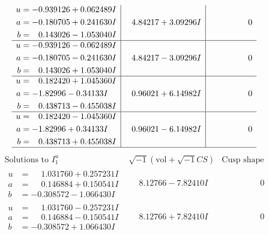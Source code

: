 \documentclass[1p]{elsarticle_modified}
\theoremstyle{definition}
\newcommand{\I}{\sqrt{-1}}
\begin{document}
$$\begin{array}{c|c|c}
\begin{aligned}
u &= -0.939126 + 0.062489 I \\
a &= -0.180705 + 0.241630 I \\
b &= \phantom{-}0.143026 - 1.053040 I\end{aligned}
 & \phantom{-}4.84217 + 3.09296 I & \phantom{-0.000000 } 0 \\ \hline\begin{aligned}
u &= -0.939126 - 0.062489 I \\
a &= -0.180705 - 0.241630 I \\
b &= \phantom{-}0.143026 + 1.053040 I\end{aligned}
 & \phantom{-}4.84217 - 3.09296 I & \phantom{-0.000000 } 0 \\ \hline\begin{aligned}
u &= \phantom{-}0.182420 + 1.045360 I \\
a &= -1.82996 - 0.34133 I \\
b &= \phantom{-}0.438713 - 0.455038 I\end{aligned}
 & \phantom{-}0.96021 + 6.14982 I & \phantom{-0.000000 } 0 \\ \hline\begin{aligned}
u &= \phantom{-}0.182420 - 1.045360 I \\
a &= -1.82996 + 0.34133 I \\
b &= \phantom{-}0.438713 + 0.455038 I\end{aligned}
 & \phantom{-}0.96021 - 6.14982 I & \phantom{-0.000000 } 0\\
 \hline 
 \end{array}$$\newpage$$\begin{array}{c|c|c}  
\text{Solutions to }I^u_{1}& \I (\text{vol} + \sqrt{-1}CS) & \text{Cusp shape}\\
 \hline 
\begin{aligned}
u &= \phantom{-}1.031760 + 0.257231 I \\
a &= \phantom{-}0.146884 + 0.150541 I \\
b &= -0.308572 - 1.066430 I\end{aligned}
 & \phantom{-}8.12766 - 7.82410 I & \phantom{-0.000000 } 0 \\ \hline\begin{aligned}
u &= \phantom{-}1.031760 - 0.257231 I \\
a &= \phantom{-}0.146884 - 0.150541 I \\
b &= -0.308572 + 1.066430 I\end{aligned}
 & \phantom{-}8.12766 + 7.82410 I & \phantom{-0.000000 } 0 \\ \hline\begin{aligned}

\end{aligned}
\end{array}$$
\end{document}
